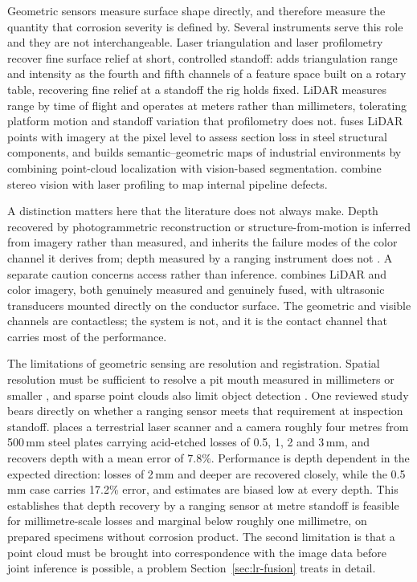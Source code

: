 Geometric sensors measure surface shape directly, and therefore measure the
quantity that corrosion severity is defined by. Several instruments serve this
role and they are not interchangeable. Laser triangulation and laser
profilometry recover fine surface relief at short, controlled standoff:
\citet{Haitz2022} adds triangulation range and intensity as the fourth and fifth
channels of a feature space built on a rotary table, recovering fine relief at a
standoff the rig holds fixed. LiDAR measures range by time of flight and operates at meters rather
than millimeters, tolerating platform motion and standoff variation that
profilometry does not. \citet{Maru2025} fuses LiDAR points with imagery at the
pixel level to assess section loss in steel structural components, and
\citet{PimenteldeFigueiredo2025} builds semantic--geometric maps of industrial environments by
combining point-cloud localization with vision-based segmentation.
\citet{Gunatilake2021} combine stereo vision with laser profiling to map internal
pipeline defects.

A distinction matters here that the literature does not always make. Depth
recovered by photogrammetric reconstruction or structure-from-motion is
inferred from imagery rather than measured, and inherits the failure modes of
the color channel it derives from; depth measured by a ranging instrument does
not \citep{Tang2025}. A separate caution concerns access rather than
inference. \citet{Ding2025} combines LiDAR and color imagery, both genuinely
measured and genuinely fused, with ultrasonic transducers mounted directly on
the conductor surface. The geometric and visible channels are contactless; the
system is not, and it is the contact channel that carries most of the
performance.

The limitations of geometric sensing are resolution and registration. Spatial
resolution must be sufficient to resolve a pit mouth measured in millimeters or
smaller \citep{Qin2026,Wang2021}, and sparse point clouds also limit object
detection \citep{Tran2024}. One reviewed study bears directly on whether a
ranging sensor meets that requirement at inspection standoff.
\citet{Maru2025} places a terrestrial laser scanner and a camera roughly four
metres from 500\,mm steel plates carrying acid-etched losses of 0.5, 1, 2 and
3\,mm, and recovers depth with a mean error of 7.8\%. Performance is depth
dependent in the expected direction: losses of 2\,mm and deeper are recovered
closely, while the 0.5\,mm case carries 17.2\% error, and estimates are biased
low at every depth. This establishes that depth recovery by a ranging sensor at
metre standoff is feasible for millimetre-scale losses and marginal below
roughly one millimetre, on prepared specimens without corrosion product. The
second limitation is that a point cloud must be brought into correspondence with
the image data before joint inference is possible, a problem
Section~\ref{sec:lr-fusion} treats in detail.


